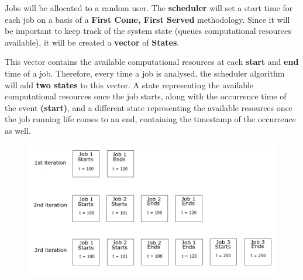 \documentclass{scrreprt}
\begin{document}
\par Jobs will be allocated to a random user. The \textbf{scheduler} will set a start time for each job on a basis of a \textbf{First Come, First Served} methodology. Since it will be important to keep track of the system state (queues computational resources available), it will be created a \textbf{vector} of \textbf{States}. 
\par This vector contains the available computational resources at each \textbf{start} and \textbf{end} time of a job. Therefore, every time a job is analysed, the scheduler algorithm will add \textbf{two states} to this vector. A state representing the available computational resources once the job starts, along with the occurrence time of the event \textbf{(start)}, and a different state representing the available resources once the job running life comes to an end, containing the timestamp of the occurrence as well.

\begin{figure}[!htb]
  \centering
  \includegraphics[width=\linewidth]{iterations.png}
\end{figure}
\end{document}
